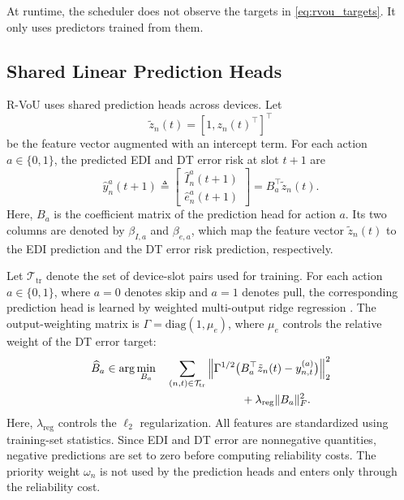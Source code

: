 \documentclass[conference]{IEEEtran}
\begin{document}
At runtime, the scheduler does not observe the targets in
\eqref{eq:rvou_targets}. It only uses predictors trained from them.
\vspace{-1.9mm}
\subsection{Shared Linear Prediction Heads}
\vspace{-0.4mm}
\noindent
R-VoU uses shared prediction heads across devices. Let
\vspace{-0.8mm}
\[
\tilde z_n(t)=[1,z_n(t)^\top]^\top
\]
be the feature vector augmented with an intercept term. For each action \(a\in\{0,1\}\), the predicted EDI and DT error risk
at slot \(t+1\) are
\vspace{-1.95mm}
\begin{equation}
\label{eq:rvou_linear_heads}
\widehat y_n^a(t+1)
\triangleq
\begin{bmatrix}
\widehat I_n^a(t+1)\\
\widehat e_n^a(t+1)
\end{bmatrix}
=
B_a^\top \tilde z_n(t).
\end{equation}
Here, \(B_a\) is the coefficient matrix of the prediction head for action
\(a\). Its two columns are denoted by \(\beta_{I,a}\) and \(\beta_{e,a}\),
which map the feature vector \(\tilde z_n(t)\) to the EDI prediction and
the DT error risk prediction, respectively.

Let \(\mathcal T_{\mathrm{tr}}\) denote the set of device-slot pairs used for
training. For each action \(a\in\{0,1\}\), where \(a=0\) denotes skip and
\(a=1\) denotes pull, the corresponding prediction head is learned by
weighted multi-output ridge regression \cite{Ridge}. The output-weighting
matrix is \(\Gamma=\mathrm{diag}(1,\mu_e)\), where \(\mu_e\) controls the
relative weight of the DT error target:
\vspace{-0.7mm}
\begin{equation}
\label{eq:rvou_ridge}
\begin{aligned}
\widehat B_a \in \arg\min_{B_a}\quad
& \sum_{(n,t)\in\mathcal T_{\mathrm{tr}}}
\left\|
\Gamma^{1/2}
\big(
B_a^\top \tilde z_n(t)-y_{n,t}^{(a)}
\big)
\right\|_2^2  \\
\vspace{-0.8mm}
&\hspace{2.3cm} + \lambda_{\mathrm{reg}}\|B_a\|_F^2 .
\end{aligned}
\end{equation}
Here, \(\lambda_{\mathrm{reg}}\) controls the \(\ell_2\) regularization.
All features are standardized using training-set statistics. Since EDI and
DT error are nonnegative quantities, negative predictions are set to zero
before computing reliability costs. The priority weight \(\omega_n\) is not
used by the prediction heads and enters only through the reliability cost.
\vspace{-1.5mm}
\end{document}
